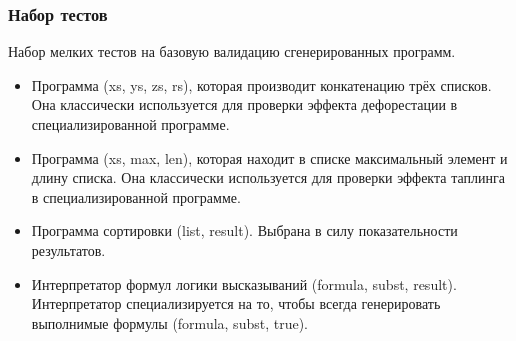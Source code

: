 \subsubsection{Набор тестов}

Набор мелких тестов на базовую валидацию сгенерированных программ.

\begin{itemize}
 \item Программа (xs, ys, zs, rs), которая
       производит конкатенацию трёх списков. Она классически используется
       для проверки эффекта дефорестации в специализированной программе.
 \item Программа (xs, max, len), которая находит в списке
       максимальный элемент и длину списка. Она классически используется
       для проверки эффекта таплинга в специализированной программе. 
 \item Программа сортировки (list, result). Выбрана в силу показательности
       результатов.
 \item Интерпретатор формул логики высказываний (formula, subst, result).
       Интерпретатор специализируется на то, чтобы всегда генерировать выполнимые формулы
       (formula, subst, true).

\end{itemize}
